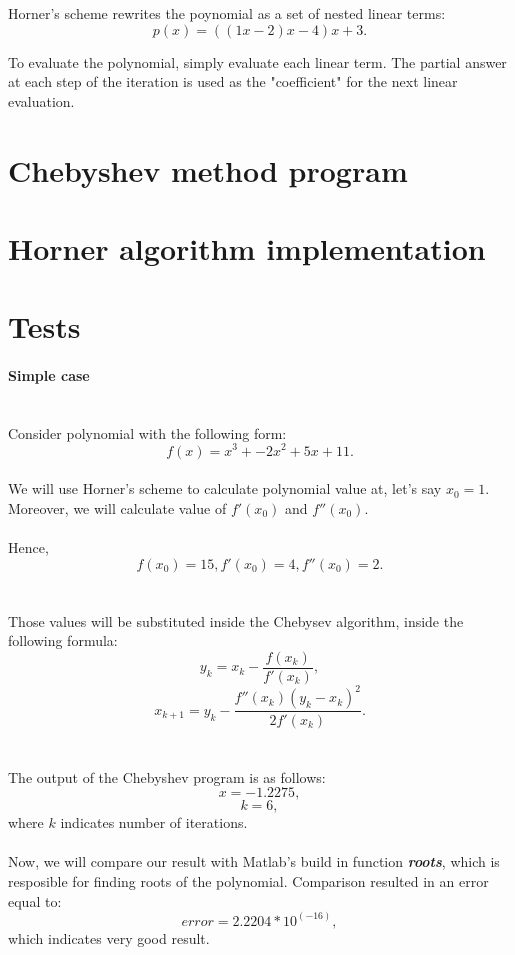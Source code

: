 \documentclass[a4paper,12pt]{article}
\begin{document}
Horner's scheme rewrites the poynomial as a set of nested linear terms:
\[p(x) = ((1x - 2)x - 4)x + 3.\]

To evaluate the polynomial, simply evaluate each linear term. The partial answer at each step of the iteration is used as the "coefficient" for the next linear evaluation.

\section{Chebyshev method program}



\section{Horner algorithm implementation}



\pagebreak

\section{Tests}

\paragraph{Simple case}\mbox{}\\

Consider polynomial with the following form:
\[f(x) = x^3 + -2x^2 + 5x + 11.\]\\
We will use Horner's scheme to calculate polynomial value at, let's say $x_{0} = 1$.
Moreover, we will calculate value of $f'(x_{0})$ and $f''(x_{0})$.\\\\
Hence,
\[
f(x_{0}) = 15, 
f'(x_{0}) = 4, 
f''(x_{0}) = 2.
\]\\\\

Those values will be substituted inside the Chebysev algorithm, inside the following formula:
\[
y_{k}=x_{k}-\frac{f(x_{k})}{f'(x_{k})},
\]
\[
x_{k+1}=y_{k}-\frac{f''(x_{k}) (y_k-x_k)^2}{2 f'(x_{k})}.
\]\\\\
The output of the Chebyshev program is as follows:
\[
x = -1.2275,
\]
\[
k = 6,
\]
where $k$ indicates number of iterations.\\\\
Now, we will compare our result with Matlab's build in function \textbf{\textit{roots}}, which is resposible for finding roots of the polynomial.
Comparison resulted in an error equal to:
\[
error = 2.2204*10^{(-16)},
\]
which indicates very good result.
\end{document}
